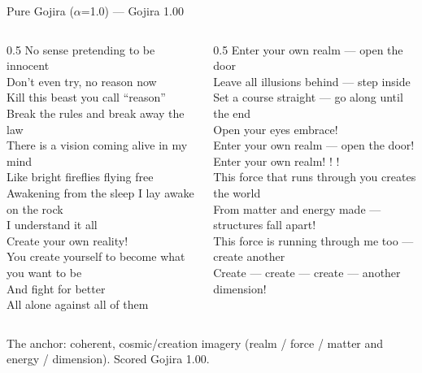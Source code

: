 \documentclass[aspectratio=169]{beamer}
\newcommand{\take}[1]{\vskip3pt\footnotesize\textcolor{accent}{#1}}
\begin{document}
\begin{frame}{Pure Gojira ($\alpha$=1.0) --- \textcolor{accent}{Gojira 1.00}}
  \scriptsize\itshape\raggedright
  \begin{columns}[T]
    \begin{column}{0.5\textwidth}
      No sense pretending to be innocent\\
      Don't even try, no reason now\\
      Kill this beast you call ``reason''\\
      Break the rules and break away the law\\[4pt]
      There is a vision coming alive in my mind\\
      Like bright fireflies flying free\\
      Awakening from the sleep I lay awake on the rock\\
      I understand it all\\[4pt]
      Create your own reality!\\
      You create yourself to become what you want to be\\
      And fight for better\\
      All alone against all of them
    \end{column}
    \begin{column}{0.5\textwidth}
      Enter your own realm --- open the door\\
      Leave all illusions behind --- step inside\\
      Set a course straight --- go along until the end\\
      Open your eyes embrace!\\[4pt]
      Enter your own realm --- open the door!\\
      Enter your own realm! ! !\\[4pt]
      This force that runs through you creates the world\\
      From matter and energy made --- structures fall apart!\\
      This force is running through me too --- create another\\
      Create --- create --- create --- another dimension!
    \end{column}
  \end{columns}
  \upshape\take{The anchor: coherent, cosmic/creation imagery (realm / force / matter and energy / dimension). Scored Gojira 1.00.}
\end{frame}
\end{document}
